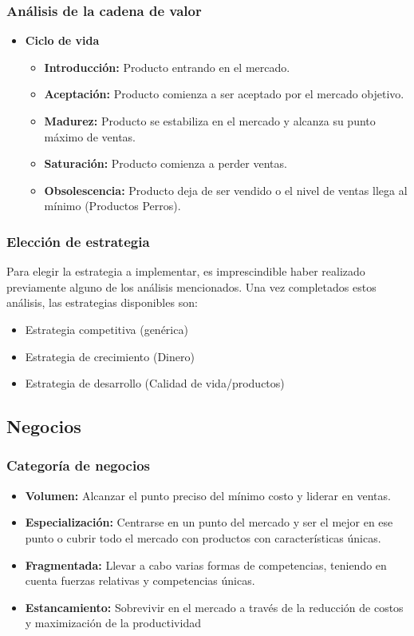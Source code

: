 \documentclass{templateNote}
\begin{document}
\subsubsection{Análisis de la cadena de valor}
\begin{itemize}
    \item \textbf{Ciclo de vida}
    \begin{itemize}
        \item \textbf{Introducción:} Producto entrando en el mercado.
        \item \textbf{Aceptación:} Producto comienza a ser aceptado por el mercado objetivo.
        \item \textbf{Madurez:} Producto se estabiliza en el mercado y alcanza su punto máximo de ventas.
        \item \textbf{Saturación:} Producto comienza a perder ventas.
        \item \textbf{Obsolescencia:} Producto deja de ser vendido o el nivel de ventas llega al mínimo (Productos Perros).
    \end{itemize}
\end{itemize}

\subsubsection{Elección de estrategia}
\noindent Para elegir la estrategia a implementar, es imprescindible haber realizado previamente alguno de los análisis mencionados. Una vez completados estos análisis, las estrategias disponibles son:
\begin{itemize}
    \item Estrategia competitiva (genérica)
    \item Estrategia de crecimiento (Dinero) 
    \item Estrategia de desarrollo (Calidad de vida/productos)
\end{itemize}

\subsection{Negocios}
\subsubsection{Categoría de negocios}
\begin{itemize}
    \item \textbf{Volumen:} Alcanzar el punto preciso del mínimo costo y liderar en ventas.
    \item \textbf{Especialización:} Centrarse en un punto del mercado y ser el mejor en ese punto o cubrir todo el mercado con productos con características únicas.
    \item \textbf{Fragmentada:} Llevar a cabo varias formas de competencias, teniendo en cuenta fuerzas relativas y competencias únicas.
    \item \textbf{Estancamiento:} Sobrevivir en el mercado a través de la reducción de costos y maximización de la productividad
\end{itemize}
\end{document}
